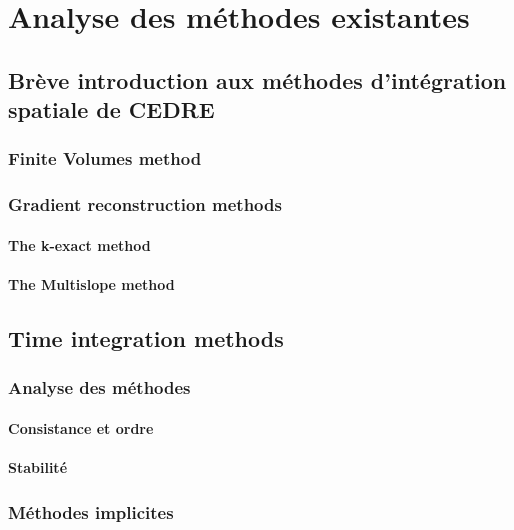 


\maketitle
\tableofcontents
{}




\chapter{Analyse des méthodes existantes}
  \section{Brève introduction aux méthodes d'intégration spatiale de CEDRE}
    \subsection{Finite Volumes method}
    \subsection{Gradient reconstruction methods}
      \subsubsection{The k-exact method}
      \subsubsection{The Multislope method}
  \section{Time integration methods}
    \subsection{Analyse des méthodes}
      \subsubsection{Consistance et ordre}
      \subsubsection{Stabilité}
    \subsection{Méthodes implicites}
